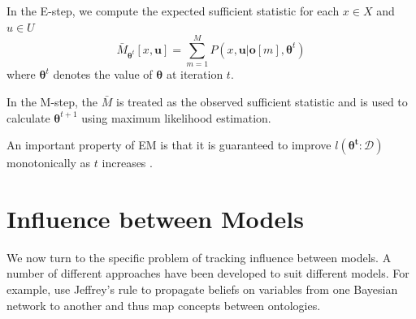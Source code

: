 \documentclass [11pt]{article}
\begin{document}
In the E-step, we compute the expected sufficient statistic for each $x\in X$ and $u \in U$
\begin{equation*}
\bar{M}_{\boldsymbol{\theta}^{t}}[x,\boldsymbol{u}] = \sum_{m=1}^{M}P(x,\boldsymbol{u}|\boldsymbol{o}[m],\boldsymbol{\theta}^{t})
\end{equation*}
where $\boldsymbol{\theta}^{t}$ denotes the value of $\boldsymbol{\theta}$ at iteration $t$.

In the M-step, the $\bar{M}$ is treated as the observed sufficient statistic and is used to calculate $\boldsymbol{\theta}^{t+1}$ using maximum likelihood estimation.

An important property of EM is that it is guaranteed to improve $l(\boldsymbol{\theta^{t}}:\mathcal{D})$ monotonically as $t$ increases \citep{koller09}.
%
\section{Influence between Models}\label{InfluenceBetweenModels}
We now turn to the specific problem of tracking influence between models. A number of different approaches have been developed to suit different models. For example, \cite{Pan05} use Jeffrey's rule \citep{pearl90} to propagate beliefs on variables from one Bayesian network to another and thus map concepts between ontologies. 
\end{document}
